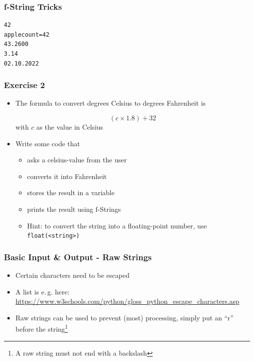 \documentclass[english]{beamer}
\begin{document}
\begin{frame}[containsverbatim]
\frametitle{f-String Tricks}



\begin{verbatim}
42
applecount=42
43.2600
3.14
02.10.2022
\end{verbatim}

\end{frame}

\begin{frame}
\frametitle{Exercise 2}

\begin{itemize}
\item The formula to convert degrees Celsius to \newline degrees Fahrenheit is

\[  (c \times 1.8) + 32 \] with $c$ as the value in Celsius

\item Write some code that 

\begin{itemize}
	\item asks a celsius-value from the user
	\item converts it into Fahrenheit 
	\item stores the result in a variable
	\item prints the result using f-Strings
	\item Hint: to convert the string into a \newline floating-point number, use \texttt{float(<string>)}
	\end{itemize}

\end{itemize}
\end{frame}


\begin{frame}[fragile]
\frametitle{Basic Input \& Output - Raw Strings}

\begin{itemize}
	\item Certain characters need to be escaped
	\item A list is e.\,g. here: \url{https://www.w3schools.com/python/gloss_python_escape_characters.asp} 
	\item Raw strings can be used to prevent (most) processing, simply put an \enquote{r} before the string\footnote{A raw string must not end with a backslash}
	\end{itemize}




\end{frame}
\end{document}
